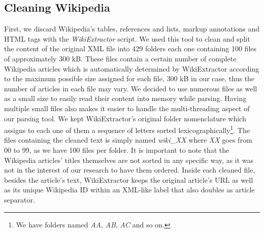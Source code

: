 \subsection{Cleaning Wikipedia} First, we discard Wikipedia's  tables, references and lists, markup annotations and HTML tags with the \textit{WikiExtractor} \cite{Attardi2015}  script. 
We used this tool to clean and split the content of the original XML file into 429 folders each one containing 100 files of approximately 300 kB. These files contain a certain number of complete Wikipedia articles which is automatically determined by WikiExtractor  according to the maximum possible size assigned for each file, 300 kB in our case, thus the number of articles in each file may vary. We decided to use numerous files as well as a small size to easily read their content into memory while parsing. Having multiple small files also makes it easier to handle the multi-threading aspect of our parsing tool.
We kept WikiExtractor's original folder nomenclature which assigns to each one of them a sequence of letters sorted lexicographically\footnote{We have folders named \textit{AA}, \textit{AB}, \textit{AC} and so on.}. The files containing the cleaned text is simply named \textit{wiki\_XX} where  \textit{XX} goes from 00 to 99, as we have 100 files per folder. 
It is important to note that the Wikipedia articles' titles themselves are not sorted in any specific way, as it was not in the interest of our research to have them ordered. 
Inside each cleaned file, besides the article's text, WikiExtractor keeps the original article's URL as well as its unique Wikipedia ID within an XML-like label that also doubles as  article separator. 


